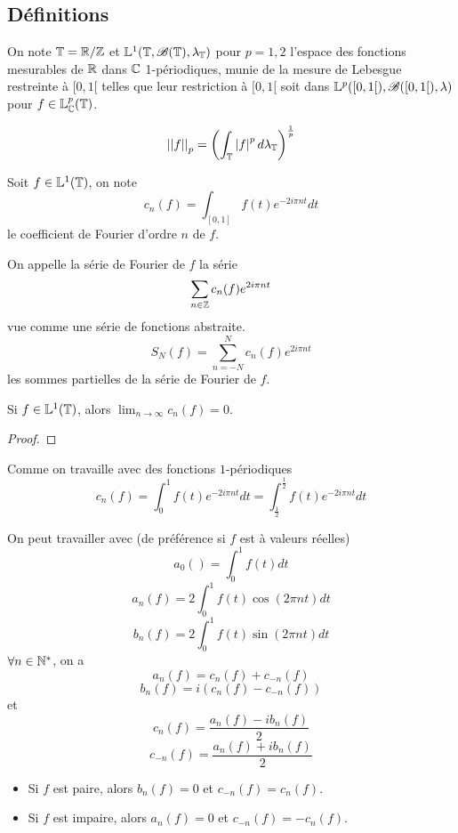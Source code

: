 \subsection{Définitions}


\begin{definition}
	On note $\mathbb{T} = \mathbb{R} / \mathbb{Z}$ et $\mathbb{L}^1(\mathbb{T}, \mathscr{B} (\mathbb{T}), \lambda_{\mathbb{T}})$ pour $p = 1,2$ l'espace des fonctions mesurables de $\mathbb{R}$ dans $\mathbb{C}$ 1-périodiques, munie de la mesure de Lebesgue restreinte à $[0,1[$
	telles que leur restriction à $[0,1[$ soit dans $\mathbb{L}^p([0,1[), \mathscr{B}([0,1[), \lambda)$ pour $f \in \mathbb{L}_{\mathbb{C}}^p(\mathbb{T})$.

	$$ {\left|\left|f\right|\right|}_p = \left( \int_{\mathbb{T}} \left|f\right|^p d\lambda_{\mathbb{T}} \right)^{\frac{1}{p}} $$
\end{definition}

\begin{definition}
	Soit $f \in \mathbb{L}^1(\mathbb{T})$, on note
	$$ c_n(f) = \int_{[0,1]} f(t) e^{-2i\pi nt} dt $$
	le coefficient de Fourier d'ordre $n$ de $f$.

	On appelle la série de Fourier de $f$ la série
	$$ \sum_{n \in \mathbb{Z}} c_n(f) e^{2i\pi nt} $$
	vue comme une série de fonctions abstraite.
	$$ S_N(f) = \sum_{n = -N}^{N} c_n(f) e^{2i\pi nt} $$
	les sommes partielles de la série de Fourier de $f$.
\end{definition}

\begin{prop}
	Si $f \in \mathbb{L}^1(\mathbb{T})$, alors $\lim_{n \to \infty} c_n(f) = 0$.
\end{prop}

\begin{proof}
\end{proof}

\begin{remarque}
	Comme on travaille avec des fonctions $1$-périodiques
	$$ c_n(f) = \int_0^1 f(t) e^{-2i\pi nt} dt  = \int_{\frac{1}{2}}^{\frac{1}{2}} f(t) e^{-2i\pi nt} dt $$
\end{remarque}



\begin{definition}
	On peut travailler avec (de préférence si $f$ est à valeurs réelles)
	$$ a_0() = \int_0^1 f(t) dt $$
	$$ a_n(f) = 2\int_0^1 f(t) \cos(2\pi nt) dt $$
	$$ b_n(f) = 2\int_0^1 f(t) \sin(2\pi nt) dt $$
	$\forall n \in \mathbb{N}^*$, on a
	$$ a_n(f) = c_n(f) + c_{-n}(f) $$
	$$ b_n(f) = i(c_n(f) - c_{-n}(f)) $$
	et
	$$ c_n(f) = \frac{a_n(f) - ib_n(f)}{2} $$
	$$ c_{-n}(f) = \frac{a_n(f) + ib_n(f)}{2} $$
\end{definition}


\begin{prop}[Parité]
	\begin{itemize}
		\item Si $f$ est paire, alors $b_n(f) = 0$ et $c_{-n}(f) = c_n(f)$.
		\item Si $f$ est impaire, alors $a_n(f) = 0$ et $c_{-n}(f) = -c_n(f)$.
	\end{itemize}
\end{prop}
